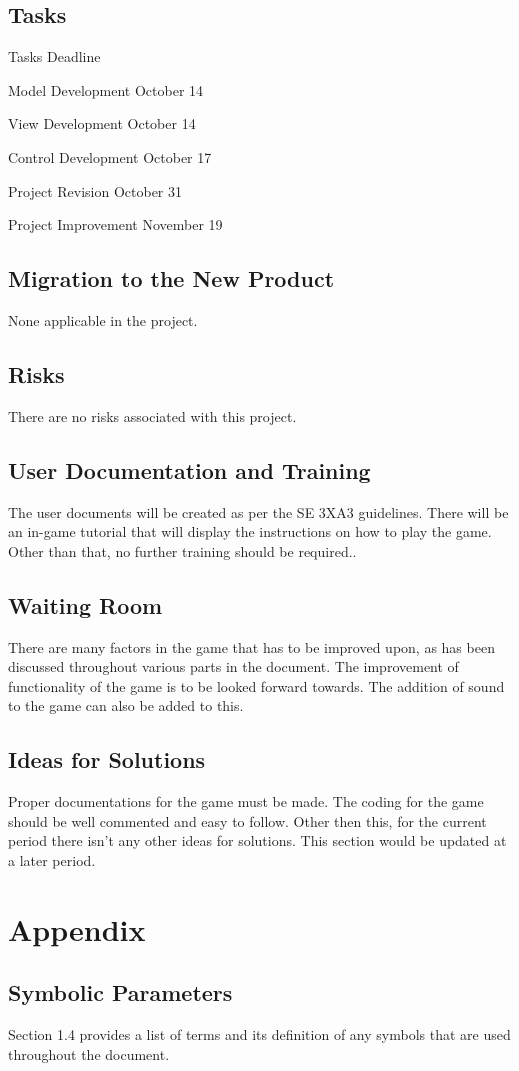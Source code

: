 \documentclass[12pt,letterpaper]{article}
\begin{document}
\subsection{Tasks}
Tasks Deadline

Model Development October 14

View Development October 14

Control Development October 17

Project Revision October 31

Project Improvement November 19
\subsection{Migration to the New Product}
None applicable in the project.
\subsection{Risks}
There are no risks associated with this project.
\subsection{User Documentation and Training}
The user documents will be created as per the SE 3XA3 guidelines.
There will be an in-game tutorial that will display the instructions on how to play the game. Other than that, no further training should be required..
\subsection{Waiting Room}
There are many factors in the game that has to be improved upon, as has been discussed throughout various parts in the document. The improvement of functionality of the game is to be looked forward towards. The addition of sound to the game can also be added to this.
\subsection{Ideas for Solutions}
Proper documentations for the game must be made. The coding for the game should be well commented and easy to follow. Other then this, for the current period there isn’t any other ideas for solutions. This section would be updated at a later period. 
\section{Appendix}
\subsection{Symbolic Parameters}
Section 1.4 provides a list of terms and its definition of any symbols that are used throughout the document.
\end{document}
